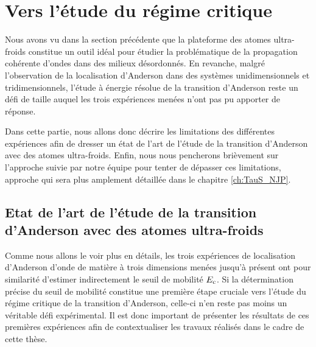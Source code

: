 \section{Vers l'étude du régime critique}
Nous avons vu dans la section précédente que la plateforme des atomes ultra-froids constitue un outil idéal pour étudier la problématique de la propagation cohérente d'ondes dans des milieux désordonnés. En revanche, malgré l'observation de la localisation d'Anderson dans des systèmes unidimensionnels et tridimensionnels, l'étude à énergie résolue de la transition d'Anderson reste un défi de taille auquel les trois expériences menées n'ont pas pu apporter de réponse.

Dans cette partie, nous allons donc décrire les limitations des différentes expériences afin de dresser un état de l'art de l'étude de la transition d'Anderson avec des atomes ultra-froids. Enfin, nous nous pencherons brièvement sur l'approche suivie par notre équipe pour tenter de dépasser ces limitations, approche qui sera plus amplement détaillée dans le chapitre \ref{ch:TauS_NJP}.

\subsection{Etat de l'art de l'étude de la transition d'Anderson avec des atomes ultra-froids}
\label{sc:etat_art_transition}
Comme nous allons le voir plus en détails, les trois expériences de localisation d'Anderson d'onde de matière à trois dimensions menées jusqu'à présent ont pour similarité d'estimer indirectement le seuil de mobilité $E_{\mathrm{c}}$. Si la détermination précise du seuil de mobilité constitue une première étape cruciale vers l'étude du régime critique de la transition d'Anderson, celle-ci n'en reste pas moins un véritable défi expérimental. Il est donc important de présenter les résultats de ces premières expériences afin de contextualiser les travaux réalisés dans le cadre de cette thèse.

